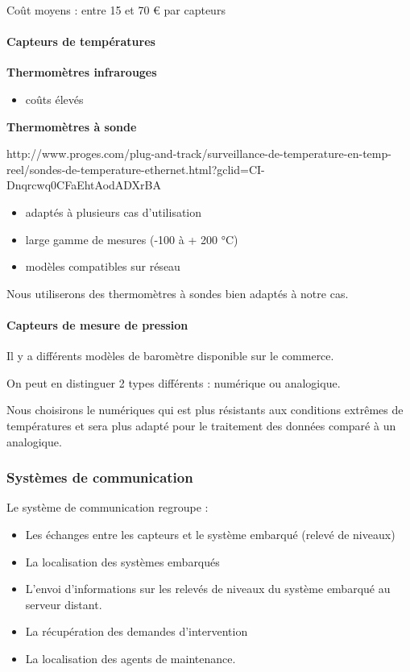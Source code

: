 \documentclass{article}
\begin{document}
Coût moyens : entre 15 et 70 € par capteurs

\paragraph{Capteurs de températures}

\textbf{Thermomètres infrarouges}
\begin{itemize}
\item coûts élevés
\end{itemize}
\textbf{Thermomètres à sonde}

http://www.proges.com/plug-and-track/surveillance-de-temperature-en-temp-reel/sondes-de-temperature-ethernet.html?gclid=CI-Dnqrcwq0CFaEhtAodADXrBA

\begin{itemize}
\item adaptés à plusieurs cas d’utilisation
\item large gamme de mesures (-100 à + 200 °C)
\item modèles compatibles sur réseau
\end{itemize}

Nous utiliserons des thermomètres à sondes bien adaptés à notre cas.

\paragraph{Capteurs de mesure de pression}

Il y a différents modèles de baromètre disponible sur le commerce.

On peut en distinguer 2 types différents : numérique ou analogique.

Nous choisirons le numériques qui est plus résistants aux conditions
extrêmes de températures et sera plus adapté pour le traitement des
données comparé à un analogique.

\subsubsection{Systèmes de communication}
Le système de communication regroupe :

\begin{itemize}
\item Les échanges entre les capteurs et le système embarqué (relevé de
niveaux)
\item La localisation des systèmes embarqués
\item L’envoi d’informations sur les relevés de niveaux du système
embarqué au serveur distant.
\item La récupération des demandes d’intervention
\item La localisation des agents de maintenance.
\end{itemize}
\end{document}
